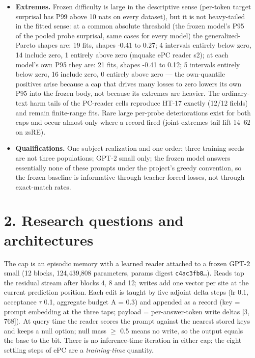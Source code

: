 \documentclass[10pt,a4paper]{article}
\begin{document}
\begin{itemize}
\item \textbf{Extremes.} Frozen difficulty is large in the descriptive sense (per-token target surprisal has P99 above 10 nats on every dataset), but it is not heavy-tailed in the fitted sense: at a common absolute threshold (the frozen model's P95 of the pooled probe surprisal, same cases for every model) the generalized-Pareto shapes are: 19 fits, shapes -0.41 to 0.27; 4 intervals entirely below zero, 14 include zero, 1 entirely above zero (mquake ePC reader s2); at each model's own P95 they are: 21 fits, shapes -0.41 to 0.12; 5 intervals entirely below zero, 16 include zero, 0 entirely above zero — the own-quantile positives arise because a cap that drives many losses to zero lowers its own P95 into the frozen body, not because its extremes are heavier. The ordinary-text harm tails of the PC-reader cells reproduce HT-17 exactly (12/12 fields) and remain finite-range fits. Rare large per-probe deteriorations exist for both caps and occur almost only where a record fired (joint-extremes tail lift 14–62 on zsRE).
\item \textbf{Qualifications.} One subject realization and one order; three training seeds are not three populations; GPT-2 small only; the frozen model answers essentially none of these prompts under the project's greedy convention, so the frozen baseline is informative through teacher-forced losses, not through exact-match rates.
\end{itemize}



\section*{2. Research questions and architectures}



The cap is an episodic memory with a learned reader attached to a frozen GPT-2 small (12 blocks, 124,439,808 parameters, params digest \texttt{c4ac3fb8\ldots{}}). Reads tap the residual stream after blocks 4, 8 and 12; writes add one vector per site at the current prediction position. Each edit is taught by five adjoint delta steps (lr 0.1, acceptance $\tau$ 0.1, aggregate budget A = 0.3) and appended as a record (key = prompt embedding at the three taps; payload = per-answer-token write deltas [3, 768]). At query time the reader scores the prompt against the nearest stored keys and keeps a null option; null mass $\ge$ 0.5 means no write, so the output equals the base to the bit. There is no inference-time iteration in either cap; the eight settling steps of ePC are a \emph{training-time} quantity.
\end{document}
